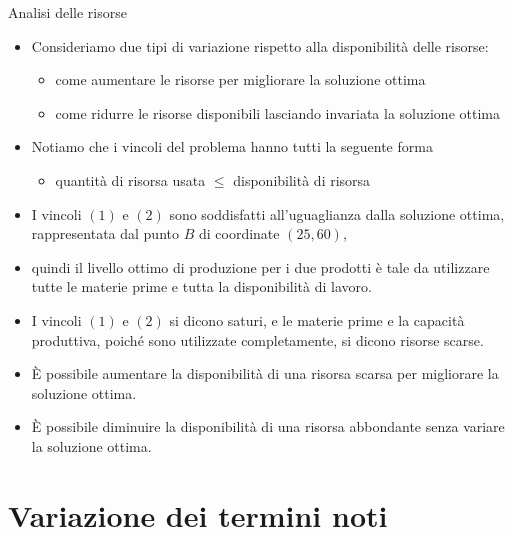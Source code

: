 \documentclass{beamer}
\begin{document}
\begin{frame}[allowframebreaks]{Analisi delle risorse}
\begin{itemize}
\item 
  Consideriamo due tipi di variazione rispetto alla disponibilità delle risorse:
  \begin{itemize}
  \item 
  come aumentare le risorse per migliorare la soluzione ottima
  \item 
  come ridurre le risorse disponibili lasciando invariata la soluzione ottima
  \end{itemize}
  
  \item  Notiamo che i vincoli del problema hanno tutti la seguente forma
  \begin{itemize}
  \item quantità di risorsa usata $\leq$ disponibilit\`a di risorsa
  \end{itemize}
  
  \item I vincoli $(1)$ e $(2)$ sono soddisfatti all'uguaglianza dalla soluzione ottima,
  rappresentata dal punto $B$ di coordinate $(25,60)$,

  \item quindi il livello ottimo di produzione per i due prodotti \`e tale da utilizzare
  tutte le materie prime e tutta la disponibilit\`a di lavoro.

  \item I vincoli $(1)$ e $(2)$ si dicono saturi, e le materie prime e la capacità produttiva,
  poich\'e sono utilizzate completamente, si dicono risorse scarse.
  
  \item \`E possibile aumentare la disponibilit\`a di una risorsa scarsa per migliorare
  la soluzione ottima.

  \item \`E possibile diminuire la disponibilità di una risorsa abbondante senza variare
  la soluzione ottima.
\end{itemize}
\end{frame}

\section{Variazione dei termini noti}
\end{document}
